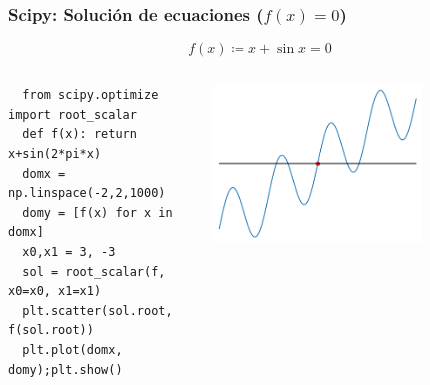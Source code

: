 \documentclass[14pt,aspectratio=169,xcolor=dvipsnames]{beamer}
\begin{document}
\begin{frame}[t,fragile]\frametitle{Scipy: Solución de ecuaciones ($f(x)=0$)}
    \begin{small}
    $$ f(x) \coloneqq x + \sin x  = 0  $$
    \vspace{-0.5cm}
    \begin{columns}
        \begin{column}{0.49\textwidth}
    \begin{verbatim}  
  from scipy.optimize import root_scalar 
  def f(x): return x+sin(2*pi*x)
  domx = np.linspace(-2,2,1000)
  domy = [f(x) for x in domx]
  x0,x1 = 3, -3
  sol = root_scalar(f, x0=x0, x1=x1)
  plt.scatter(sol.root, f(sol.root))
  plt.plot(domx, domy);plt.show()

    \end{verbatim}
        \end{column}
        \begin{column}{0.5\textwidth}
            \begin{flushright}
                \includegraphics[width=0.7\textwidth]{../images/scipy-root.png}
            \end{flushright}
        \end{column}
    \end{columns}
    \pause{}
    \end{small}
\end{frame}
\end{document}
